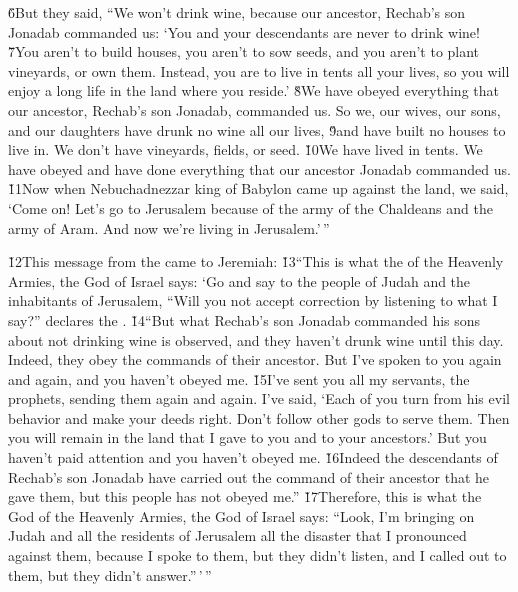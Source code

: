 \v{6}But they said, ``We won't drink wine, because our ancestor, Rechab's son Jonadab commanded us: `You and your descendants are never to drink wine! \v{7}You aren't to build houses, you aren't to sow seeds, and you aren't to plant vineyards, or own them. Instead, you are to live in tents all your lives, so you will enjoy a long life in the land where you reside.' \v{8}We have obeyed everything that our ancestor, Rechab's son Jonadab, commanded us. So we, our wives, our sons, and our daughters have drunk no wine all our lives, \v{9}and have built no houses to live in. We don't have vineyards, fields, or seed. \v{10}We have lived in tents. We have obeyed and have done everything that our ancestor Jonadab commanded us. \v{11}Now when Nebuchadnezzar king of Babylon came up against the land, we said, `Come on! Let's go to Jerusalem because of the army of the Chaldeans and the army of Aram. And now we're living in Jerusalem.'\,''

\v{12}This message from the  came to Jeremiah: \v{13}``This is what the  of the Heavenly Armies, the God of Israel says: `Go and say to the people of Judah and the inhabitants of Jerusalem, ``Will you not accept correction by listening to what I say?'' declares the . \v{14}``But what Rechab's son Jonadab commanded his sons about not drinking wine is observed, and they haven't drunk wine until this day. Indeed, they obey the commands of their ancestor. But I've spoken to you again and again, and you haven't obeyed me. \v{15}I've sent you all my servants, the prophets, sending them again and again. I've said, `Each of you turn from his evil behavior and make your deeds right. Don't follow other gods to serve them. Then you will remain in the land that I gave to you and to your ancestors.' But you haven't paid attention and you haven't obeyed me. \v{16}Indeed the descendants of Rechab's son Jonadab have carried out the command of their ancestor that he gave them, but this people has not obeyed me.'' \v{17}Therefore, this is what the  God of the Heavenly Armies, the God of Israel says: ``Look, I'm bringing on Judah and all the residents of Jerusalem all the disaster that I pronounced against them, because I spoke to them, but they didn't listen, and I called out to them, but they didn't answer.''\,'\,''

